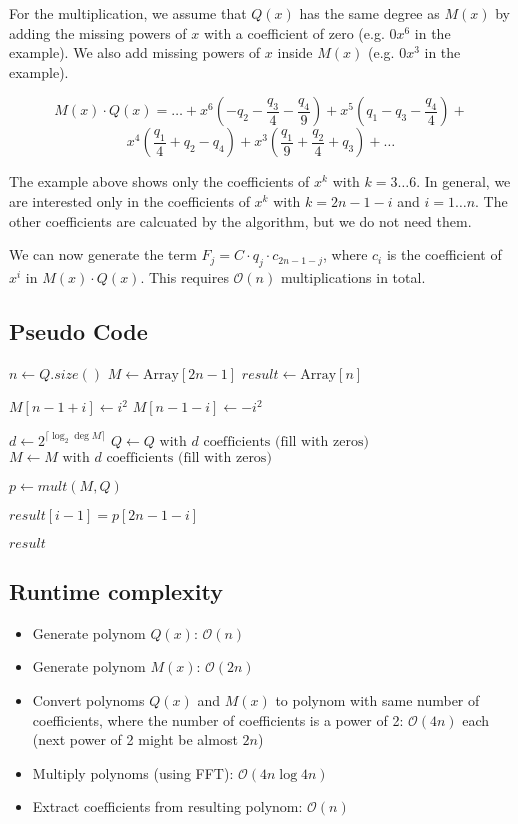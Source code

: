 \documentclass[12pt]{article}
\begin{document}
For the multiplication, we assume that $Q(x)$ has the same degree as $M(x)$ by adding the missing powers of $x$ with a coefficient of zero (e.g. $0 x^6$ in the example). We also add missing powers of $x$ inside $M(x)$ (e.g. $0 x^3$ in the example).

$$ M(x) \cdot Q(x) = \ldots + x^6 (-q_2 - \frac{q_3}{4} - \frac{q_4}{9}) + x^5 (q_1 - q_3 - \frac{q_4}{4}) + $$ $$ x^4 (\frac{q_1}{4} + q_2 - q_4) + x^3 (\frac{q_1}{9} + \frac{q_2}{4} + q_3) + \ldots $$

The example above shows only the coefficients of $x^k$ with $k = 3 \ldots 6$. In general, we are interested only in the coefficients of $x^k$ with $k=2n-1-i$ and $i = 1 \ldots n$. The other coefficients are calcuated by the algorithm, but we do not need them.

We can now generate the term $F_j = C \cdot q_j \cdot c_{2n - 1 - j}$, where $c_i$ is the coefficient of $x^i$ in $M(x) \cdot Q(x)$. This requires $\mathcal{O}(n)$ multiplications in total.

\subsection*{Pseudo Code}
\begin{algorithmic}
	\State $n \gets Q.\mathit{size}()$
	\State $M \gets \mbox{Array}[2n-1]$
	\State $\mathit{result} \gets \mbox{Array}[n]$
	
		\State $M[n-1+i] \gets i^2$
		\State $M[n-1-i] \gets -i^2$
	\EndFor

	\State $d \gets 2^{\lceil \log_2 \deg M \rceil}$
	\State $Q \gets Q \mbox{ with $d$ coefficients (fill with zeros)}$
	\State $M \gets M \mbox{ with $d$ coefficients (fill with zeros)}$

	\State $p \gets \mathit{mult}(M, Q)$
	
		\State $\mathit{result}[i-1] = p[2n - 1 - i]$
	\EndFor

	\Return $\mathit{result}$
\end{algorithmic}

\subsection*{Runtime complexity}
\begin{itemize}
	\item Generate polynom $Q(x)$: $\mathcal{O}(n)$
	\item Generate polynom $M(x)$: $\mathcal{O}(2n)$
	\item Convert polynoms $Q(x)$ and $M(x)$ to polynom with same number of coefficients, where the number of coefficients is a power of 2: $\mathcal{O}(4n)$ each (next power of 2 might be almost $2n$)
	\item Multiply polynoms (using FFT): $\mathcal{O}(4n \log 4n)$
	\item Extract coefficients from resulting polynom: $\mathcal{O}(n)$
\end{itemize}
\end{document}
